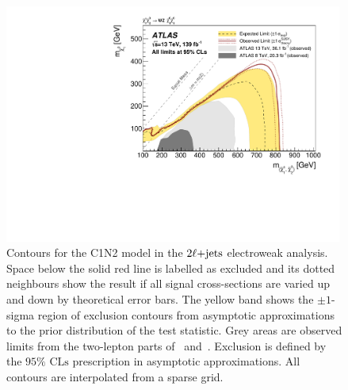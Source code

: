 
\begin{figure}[tp]
\centering
\includegraphics[width=0.99\textwidth]{figures/2ljets_contours_c1n2.pdf}
\caption{%
Contours for the C1N2 model in the $2\ell\mathrm{+jets}$ electroweak analysis.
Space below the solid red line is labelled as excluded and its dotted
neighbours show the result if all signal cross-sections are varied up and down
by theoretical error bars.
The yellow band shows the $\pm1$-sigma region of exclusion contours
from asymptotic approximations to the prior distribution of the test statistic.
Grey areas are observed limits from the two-lepton parts
of~\cite{SUSY-2016-24} and~\cite{SUSY-2013-11}.
Exclusion is defined by the $95\%$ $\mathrm{CLs}$ prescription
in asymptotic approximations.
All contours are interpolated from a sparse grid.
}
\label{fig:2ljets_contours_c1n2}
\end{figure}

